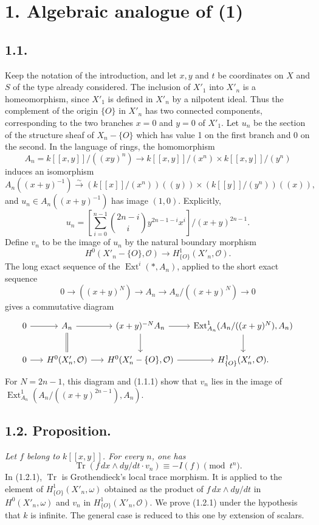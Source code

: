 \documentclass[11pt,leqno]{article}
\DeclareMathOperator{\Ext}{Ext}
\DeclareMathOperator{\Tr}{Tr}
\newcommand{\OO}{\mathcal O}
\begin{document}
\section*{1. Algebraic analogue of (1)}

\subsection*{1.1.}
Keep the notation of the introduction, and let $x,y$ and $t$ be coordinates on $X$ and $S$ of the type already considered.
\clearpage
The inclusion of $X'_1$ into $X'_n$ is a homeomorphism, since $X'_1$ is defined in $X'_n$ by a nilpotent ideal. Thus the complement of the origin $\{O\}$ in $X'_n$ has two connected components, corresponding to the two branches $x=0$ and $y=0$ of $X'_1$. Let $u_n$ be the section of the structure sheaf of $X_n-\{O\}$ which has value 1 on the first branch and 0 on the second. In the language of rings, the homomorphism
\[
        A_n=k[[x,y]]/((xy)^n)\longrightarrow k[[x,y]]/(x^n)\times k[[x,y]]/(y^n)
\]
induces an isomorphism
\[
        A_n((x+y)^{-1})\xrightarrow{\sim}
        (k[[x]]/(x^n))((y))\times(k[[y]]/(y^n))((x)),
\]
and $u_n\in A_n((x+y)^{-1})$ has image $(1,0)$. Explicitly,
\begin{equation}
        u_n=\left[\sum_{i=0}^{n-1}\binom{2n-i}{i}y^{2n-1-i}x^i\right]\big/(x+y)^{2n-1}. \tag{1.1.1}
\end{equation}
Define $v_n$ to be the image of $u_n$ by the natural boundary morphism
\[
        H^0(X'_n-\{O\},\OO)\longrightarrow H^1_{\{O\}}(X'_n,\OO).
\]
The long exact sequence of the $\Ext^i(*,A_n)$, applied to the short exact sequence
\[
        0\longrightarrow ((x+y)^N)\longrightarrow A_n\longrightarrow A_n/((x+y)^N)\longrightarrow0
\]
gives a commutative diagram
\[
\begin{tikzcd}[column sep=1.5em,row sep=2.1em]
0 \arrow[r] & A_n \arrow[r] \arrow[d,equal] &
(x+y)^{-N}A_n \arrow[r] \arrow[d] &
\Ext^1_{A_n}(A_n/((x+y)^N),A_n) \arrow[d] \\
0 \arrow[r] & H^0(X'_n,\OO) \arrow[r] &
H^0(X'_n-\{O\},\OO) \arrow[r] & H^1_{\{O\}}(X'_n,\OO).
\end{tikzcd}
\]
For $N=2n-1$, this diagram and (1.1.1) show that $v_n$ lies in the image of $\Ext^1_{A_n}(A_n/((x+y)^{2n-1}),A_n)$.

\subsection*{1.2. Proposition.}
\emph{Let $f$ belong to $k[[x,y]]$. For every $n$, one has}
\begin{equation}
        \Tr(f\,dx\wedge dy/dt\cdot v_n)\equiv -I(f)\pmod {t^n}. \tag{1.2.1}
\end{equation}
In (1.2.1), $\Tr$ is Grothendieck's local trace morphism. It is applied to the element of $H^1_{\{O\}}(X'_n,\omega)$ obtained as the product of $f\,dx\wedge dy/dt$ in $H^0(X'_n,\omega)$ and $v_n$ in $H^1_{\{O\}}(X'_n,\OO)$. We prove (1.2.1) under the hypothesis that $k$ is infinite. The general case is reduced to this one by extension of scalars.
\end{document}
